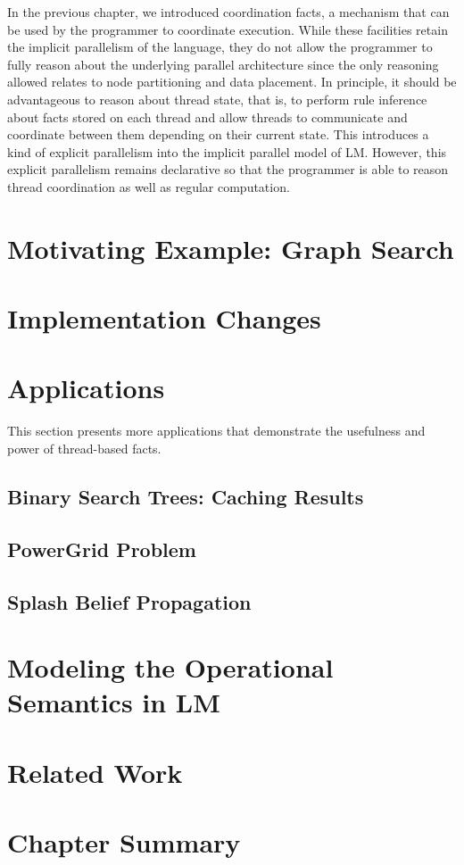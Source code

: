 In the previous chapter, we introduced coordination facts, a mechanism that can
be used by the programmer to coordinate execution. While these facilities retain
the implicit parallelism of the language, they do not allow the programmer to
fully reason about the underlying parallel architecture since the only reasoning
allowed relates to node partitioning and data placement. In principle, it should
be advantageous to reason about thread state, that is, to perform rule inference
about facts stored on each thread and allow threads to communicate and
coordinate between them depending on their current state. This introduces a kind
of explicit parallelism into the implicit parallel model of LM.  However, this
explicit parallelism remains declarative so that the programmer is able to
reason thread coordination as well as regular computation.

\section{Motivating Example: Graph Search}


\section{Implementation Changes}


\section{Applications}

This section presents more applications that demonstrate the usefulness and
power of thread-based facts.

\subsection{Binary Search Trees: Caching Results}


\subsection{PowerGrid Problem}


\subsection{Splash Belief Propagation}\label{sec:coordination:bp}


\section{Modeling the Operational Semantics in LM}


\section{Related Work}


\section{Chapter Summary}

